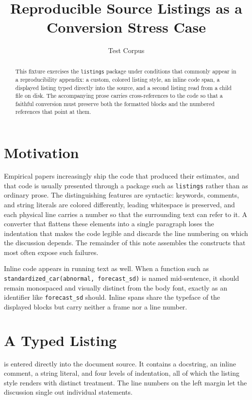 \documentclass[11pt]{article}
\title{Reproducible Source Listings as a Conversion Stress Case}
\author{Test Corpus}
\date{}
\begin{document}
\maketitle

\begin{abstract}
This fixture exercises the \texttt{listings} package under conditions that
commonly appear in a reproducibility appendix: a custom, colored listing style,
an inline code span, a displayed listing typed directly into the source, and a
second listing read from a child file on disk. The accompanying prose carries
cross-references to the code so that a faithful conversion must preserve both
the formatted blocks and the numbered references that point at them.
\end{abstract}

\section{Motivation}
\label{sec:motivation}

Empirical papers increasingly ship the code that produced their estimates, and
that code is usually presented through a package such as \texttt{listings} rather
than as ordinary prose. The distinguishing features are syntactic: keywords,
comments, and string literals are colored differently, leading whitespace is
preserved, and each physical line carries a number so that the surrounding text
can refer to it. A converter that flattens these elements into a single
paragraph loses the indentation that makes the code legible and discards the line
numbering on which the discussion depends. The remainder of this note assembles
the constructs that most often expose such failures.

Inline code appears in running text as well. When a function such as
\lstinline|standardized_car(abnormal, forecast_sd)| is named mid-sentence, it
should remain monospaced and visually distinct from the body font, exactly as an
identifier like \lstinline|forecast_sd| should. Inline spans share the typeface
of the displayed blocks but carry neither a frame nor a line number.

\section{A Typed Listing}
\label{sec:typed}

 is entered directly into the document source. It contains a
docstring, an inline comment, a string literal, and four levels of indentation,
all of which the listing style renders with distinct treatment. The line numbers
on the left margin let the discussion single out individual statements.
\end{document}

